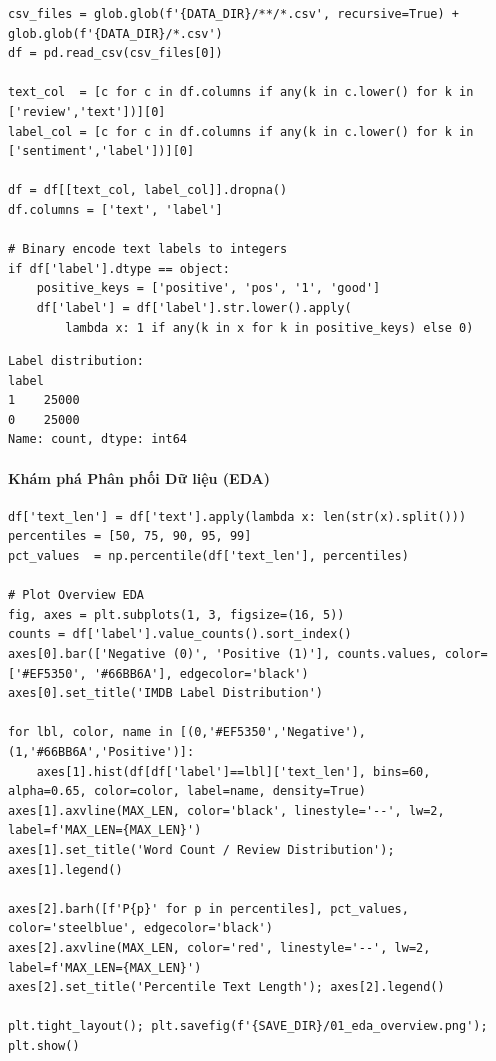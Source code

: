 \begin{lstlisting}[style=pythoncode, caption={Tải bộ dữ liệu IMDB 50.000 mẫu}]
csv_files = glob.glob(f'{DATA_DIR}/**/*.csv', recursive=True) + glob.glob(f'{DATA_DIR}/*.csv')
df = pd.read_csv(csv_files[0])

text_col  = [c for c in df.columns if any(k in c.lower() for k in ['review','text'])][0]
label_col = [c for c in df.columns if any(k in c.lower() for k in ['sentiment','label'])][0]

df = df[[text_col, label_col]].dropna()
df.columns = ['text', 'label']

# Binary encode text labels to integers
if df['label'].dtype == object:
    positive_keys = ['positive', 'pos', '1', 'good']
    df['label'] = df['label'].str.lower().apply(
        lambda x: 1 if any(k in x for k in positive_keys) else 0)
\end{lstlisting}

\begin{lstlisting}[style=consoleoutput, caption={Output: Dữ liệu phân bổ cân bằng tuyệt đối}]
Label distribution:
label
1    25000
0    25000
Name: count, dtype: int64
\end{lstlisting}

\paragraph{Khám phá Phân phối Dữ liệu (EDA)} \hfill\mbox{}

\begin{lstlisting}[style=pythoncode, caption={Tính toán và vẽ biểu đồ Thống kê Độ dài văn bản}]
df['text_len'] = df['text'].apply(lambda x: len(str(x).split()))
percentiles = [50, 75, 90, 95, 99]
pct_values  = np.percentile(df['text_len'], percentiles)

# Plot Overview EDA
fig, axes = plt.subplots(1, 3, figsize=(16, 5))
counts = df['label'].value_counts().sort_index()
axes[0].bar(['Negative (0)', 'Positive (1)'], counts.values, color=['#EF5350', '#66BB6A'], edgecolor='black')
axes[0].set_title('IMDB Label Distribution')

for lbl, color, name in [(0,'#EF5350','Negative'), (1,'#66BB6A','Positive')]:
    axes[1].hist(df[df['label']==lbl]['text_len'], bins=60, alpha=0.65, color=color, label=name, density=True)
axes[1].axvline(MAX_LEN, color='black', linestyle='--', lw=2, label=f'MAX_LEN={MAX_LEN}')
axes[1].set_title('Word Count / Review Distribution'); axes[1].legend()

axes[2].barh([f'P{p}' for p in percentiles], pct_values, color='steelblue', edgecolor='black')
axes[2].axvline(MAX_LEN, color='red', linestyle='--', lw=2, label=f'MAX_LEN={MAX_LEN}')
axes[2].set_title('Percentile Text Length'); axes[2].legend()

plt.tight_layout(); plt.savefig(f'{SAVE_DIR}/01_eda_overview.png'); plt.show()
\end{lstlisting}

